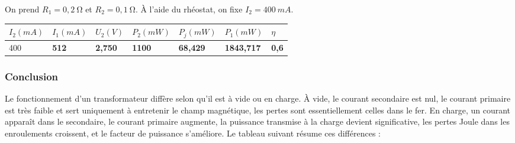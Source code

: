 \documentclass[french, 12pt]{article}
\begin{document}
On prend $R_1 = 0,2\ \si{\ohm}$ et $R_2 = 0,1\ \si{\ohm}$. À l'aide du rhéostat, on fixe $I_2 = 400\ \si{mA}$.

\begin{table}[H]
	\centering
	\begin{tabular}{ | M{1.7cm} | M{1.7cm} | M{1.5cm} | M{1.7cm} | M{1.5cm} | M{1.8cm} | M{1cm} | }
		\hline
		$I_2 \left( \si{mA} \right)$ & $I_1 \left( \si{mA} \right)$ & $U_2 \left( \si{V} \right)$ & $P_2 \left( \si{mW} \right)$ & $P_j \left( \si{mW} \right)$ & $P_1 \left( \si{mW} \right)$ & $\eta$ \\
		 & \color{purple} \textbf{512} & \color{purple} \textbf{2,750} & \color{purple} \textbf{1100} & \color{purple} \textbf{68,429} & \color{purple} \textbf{1843,717} & \color{purple} \textbf{0,6} \\
		\hline
	\end{tabular}
\end{table}

\subsubsection{Conclusion}

Le fonctionnement d’un transformateur diffère selon qu’il est à vide ou en charge. À vide, le courant secondaire est nul, le courant primaire est très faible et sert uniquement à entretenir le champ magnétique, les pertes sont essentiellement celles dans le fer. En charge, un courant apparaît dans le secondaire, le courant primaire augmente, la puissance transmise à la charge devient significative, les pertes Joule dans les enroulements croissent, et le facteur de puissance s’améliore. Le tableau suivant résume ces différences :
\end{document}
